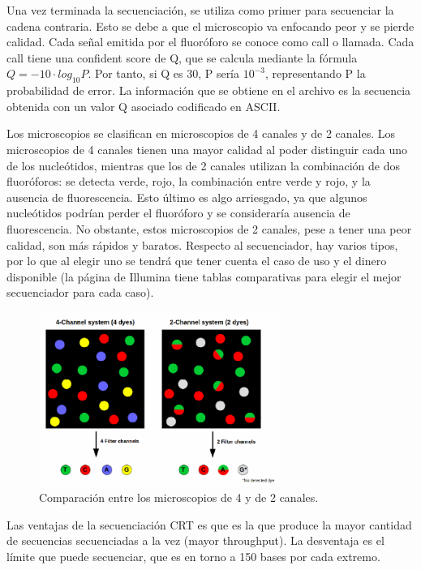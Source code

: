 \begin{itemize}
\begin{itemize}
Una vez terminada la secuenciación, se utiliza como primer para secuenciar la cadena contraria. Esto se debe a que el microscopio va enfocando peor y se pierde calidad. Cada señal emitida por el fluoróforo se conoce como call o llamada. Cada call tiene una confident score de Q, que se calcula mediante la fórmula $Q = - 10 \cdot log_{10} P $. Por tanto, si Q es 30, P sería $10^{-3}$, representando P la probabilidad de error. La información que se obtiene en el archivo es la secuencia obtenida con un valor Q asociado codificado en ASCII. 

Los microscopios se clasifican en microscopios de 4 canales y de 2 canales. Los microscopios de 4 canales tienen una mayor calidad al poder distinguir cada uno de los nucleótidos, mientras que los de 2 canales utilizan la combinación de dos fluoróforos: se detecta verde, rojo, la combinación entre verde y rojo, y la ausencia de fluorescencia. Esto último es algo arriesgado, ya que algunos nucleótidos podrían perder el fluoróforo y se consideraría ausencia de fluorescencia. No obstante, estos microscopios de 2 canales, pese a tener una peor calidad, son más rápidos y baratos. Respecto al secuenciador, hay varios tipos, por lo que al elegir uno se tendrá que tener cuenta el caso de uso y el dinero disponible (la página de Illumina tiene tablas comparativas para elegir el mejor secuenciador para cada caso). 

\begin{figure}[htbp]
\centering
\includegraphics[width = 0.7\textwidth]{figs/microscope-channels.png}
\caption{Comparación entre los microscopios de 4 y de 2 canales.}
\end{figure}

Las ventajas de la secuenciación CRT es que es la que produce la mayor cantidad de secuencias secuenciadas a la vez (mayor throughput). La desventaja es el límite que puede secuenciar, que es en torno a 150 bases por cada extremo. 


\end{itemize}
\end{itemize}
